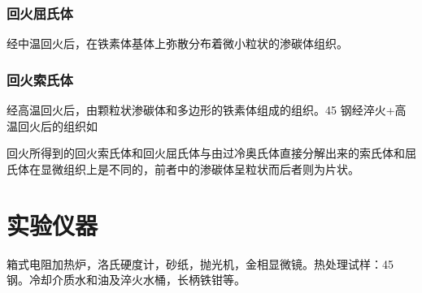 \documentclass[a4paper,utf8]{article}
\begin{document}
            \subsubsection{回火屈氏体}
                经中温回火后，在铁素体基体上弥散分布着微小粒状的渗碳体组织。
            \subsubsection{回火索氏体}
                经高温回火后，由颗粒状渗碳体和多边形的铁素体组成的组织。45 钢经淬火+高温回火后的组织如\par
                回火所得到的回火索氏体和回火屈氏体与由过冷奥氏体直接分解出来的索氏体和屈氏体在显微组织上是不同的，前者中的渗碳体呈粒状而后者则为片状。
\section{实验仪器}%
箱式电阻加热炉，洛氏硬度计，砂纸，抛光机，金相显微镜。热处理试样：45 钢。冷却介质水和油及淬火水桶，长柄铁钳等。
\end{document}
